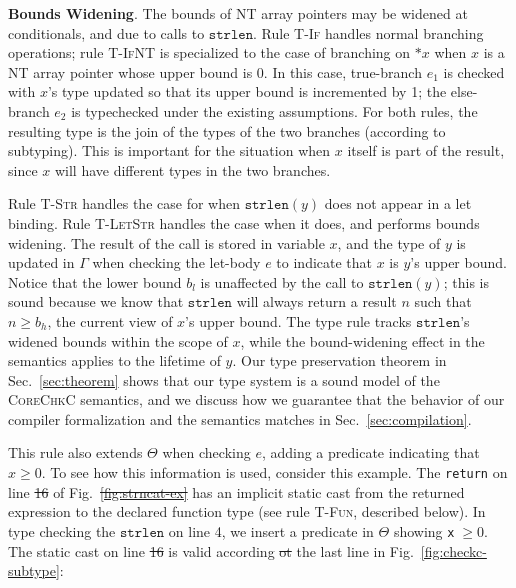 \documentclass[conference]{IEEEtran}
\newcommand{\myparagraph}[1]{\textbf{#1}.\xspace}
\newcommand{\code}[1]{\lstinline|#1|}
\newcommand{\lang}{\textsc{CoreChkC}\xspace}
\newcommand{\CoreChkC}{\lang} %
\newcommand{\kw}[1]{\ensuremath{\mathtt{#1}}}
\newcommand{\estrlentext}{\ensuremath{\kw{strlen}}}
\newcommand{\estar}[1]{\ensuremath{\texttt{*}{#1}}}
\providecommand{\DIFadd}[1]{{\protect\color{blue}\uwave{#1}}} %
\providecommand{\DIFdel}[1]{{\protect\color{red}\sout{#1}}}                      %
\providecommand{\DIFaddbegin}{} %
\providecommand{\DIFaddend}{} %
\providecommand{\DIFdelbegin}{} %
\providecommand{\DIFdelend}{} %
\newcommand{\DIFscaledelfig}{0.5}
\newlength{\DIFdelgraphicswidth} %
\newlength{\DIFdelgraphicsheight} %
\newcommand{\DIFaddincludegraphics}[2][]{{\color{blue}\fbox{\DIFOincludegraphics[#1]{#2}}}} %
\newcommand{\DIFdelincludegraphics}[2][]{%
\sbox{\DIFdelgraphicsbox}{\DIFOincludegraphics[#1]{#2}}%
\settoboxwidth{\DIFdelgraphicswidth}{\DIFdelgraphicsbox} %
\settoboxtotalheight{\DIFdelgraphicsheight}{\DIFdelgraphicsbox} %
\scalebox{\DIFscaledelfig}{%
\parbox[b]{\DIFdelgraphicswidth}{\usebox{\DIFdelgraphicsbox}\\[-\baselineskip] \rule{\DIFdelgraphicswidth}{0em}}\llap{\resizebox{\DIFdelgraphicswidth}{\DIFdelgraphicsheight}{%
\setlength{\unitlength}{\DIFdelgraphicswidth}%
\begin{picture}(1,1)%
\thicklines\linethickness{2pt} %
{\color[rgb]{1,0,0}\put(0,0){\framebox(1,1){}}}%
{\color[rgb]{1,0,0}\put(0,0){\line( 1,1){1}}}%
{\color[rgb]{1,0,0}\put(0,1){\line(1,-1){1}}}%
\end{picture}%
}\hspace*{3pt}}} %
} %
\DeclareRobustCommand{\DIFaddbegin}{\DIFOaddbegin \let\includegraphics\DIFaddincludegraphics} %
\DeclareRobustCommand{\DIFaddend}{\DIFOaddend \let\includegraphics\DIFOincludegraphics} %
\DeclareRobustCommand{\DIFdelbegin}{\DIFOdelbegin \let\includegraphics\DIFdelincludegraphics} %
\DeclareRobustCommand{\DIFdelend}{\DIFOaddend \let\includegraphics\DIFOincludegraphics} %
\begin{document}
\myparagraph{Bounds Widening}
The bounds of NT array pointers may be widened at conditionals, and
due to calls to $\estrlentext$.  Rule \textsc{T-If} handles normal
branching operations; rule \textsc{T-IfNT} is specialized to the case
of branching on $\estar{x}$ when $x$ is a NT array pointer whose upper
bound is 0. In this case, true-branch $e_1$ is checked with $x$'s type
updated so that its upper bound is incremented by 1; the else-branch
$e_2$ is typechecked under the existing assumptions. For both rules,
the resulting type is the join of the types of the two branches
(according to subtyping). This is important for the situation when $x$
itself is part of the result, since $x$ will have
different types in the two branches.



Rule \textsc{T-Str} handles the case for when $\estrlentext(y)$ does
not appear in a let binding. Rule \textsc{T-LetStr} handles the case
when it does, and performs bounds widening. The result of the call is
stored in variable $x$, and the type of $y$ is updated in $\Gamma$ when
checking the let-body $e$ to indicate that $x$ is $y$'s upper
bound. Notice that the lower bound $b_l$ is unaffected by the call to
$\estrlentext(y)$; this is sound because we know that $\estrlentext$
will always return a result $n$ such that $n \ge b_h$, the current
view of $x$'s upper bound.
The type rule tracks $\estrlentext$'s widened bounds
within the scope of $x$, while the bound-widening effect in the semantics applies to the lifetime of $y$.
Our type preservation theorem in Sec.~\ref{sec:theorem}
shows that our type system is a sound model of the \CoreChkC semantics,
and we discuss how we guarantee that the behavior of our compiler formalization and the semantics matches in Sec.~\ref{sec:compilation}.

This rule also extends $\Theta$ when checking $e$, adding a predicate
indicating that $x\ge 0$. To see how this information is used,
consider this example.  The \code{return} on line \DIFdelbegin \DIFdel{16 }\DIFdelend \DIFaddbegin \DIFadd{13 }\DIFaddend of
Fig.~\DIFdelbegin \DIFdel{\ref{fig:strncat-ex} }\DIFdelend \DIFaddbegin \DIFadd{\ref{fig:strcat-ex} }\DIFaddend has an implicit static cast from the
returned expression to the declared function type (see rule
\textsc{T-Fun}, described below). In type checking the $\estrlentext$
on line 4, we insert a predicate in $\Theta$ showing
\DIFdelbegin %
\DIFdelend \DIFaddbegin \code{x}\DIFaddend $\;\ge 0$.  The static cast on line \DIFdelbegin \DIFdel{16 }\DIFdelend \DIFaddbegin \DIFadd{13 }\DIFaddend is valid according \DIFdelbegin \DIFdel{ot
}\DIFdelend \DIFaddbegin \DIFadd{to
}\DIFaddend the last line in Fig.~\ref{fig:checkc-subtype}:
\DIFaddbegin 
\end{document}
